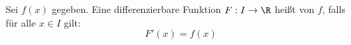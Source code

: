 Sei $f(x)$ gegeben. Eine differenzierbare Funktion $F: I \to \R$ heißt  von $f$, falls für alle $x \in I$ gilt:
$$F'(x) = f(x)$$